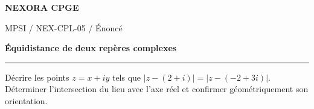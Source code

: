 \documentclass[11pt,a4paper]{article}
\begin{document}
{\small\bfseries\color{nexorablue} NEXORA CPGE}\par
{\small MPSI / NEX-CPL-05 / Énoncé}\par
{\LARGE\bfseries Équidistance de deux repères complexes}\par
\vspace{0.25em}\hrule\vspace{0.6em}

Décrire les points $z=x+iy$ tels que $|z-(2+i)|=|z-(-2+3i)|$. Déterminer l’intersection du lieu avec l’axe réel et confirmer géométriquement son orientation.
\end{document}
